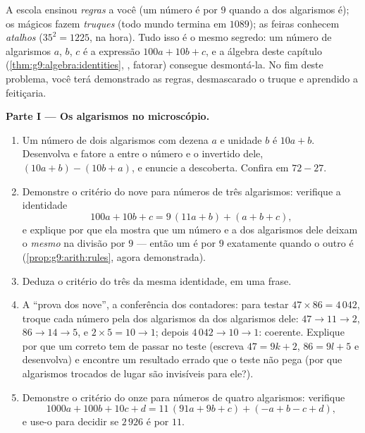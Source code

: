 \begin{problem}
\label{pb:g9:algebra:1}
A escola ensinou \emph{regras} a você (um número é  por $9$
quando a  dos algarismos é); os mágicos fazem \emph{truques} (todo
mundo termina em $1089$); as feiras conhecem \emph{atalhos}
($35^2 = 1225$, na hora). Tudo isso é o mesmo segredo: um número de
algarismos $a$, $b$, $c$ é a expressão $100a + 10b + c$, e a álgebra
deste capítulo (\cref{thm:g9:algebra:identities}, , fatorar)
consegue desmontá-la. No fim deste problema, você terá demonstrado as
regras, desmascarado o truque e aprendido a feitiçaria.

\medskip
\noindent\textbf{Parte I --- Os algarismos no microscópio.}
\begin{enumerate}
  \item Um número de dois algarismos com dezena $a$ e unidade $b$ é
        $10a + b$. Desenvolva e fatore a  entre o número e o
        invertido dele, $(10a + b) - (10b + a)$, e enuncie a
        descoberta. Confira em $72 - 27$.
  \item Demonstre o critério do nove para números de três algarismos:
        verifique a identidade
        \[
        100a + 10b + c = 9\,(11a + b) + (a + b + c),
        \]
        e explique por que ela mostra que um número e a  dos
        algarismos dele deixam o \emph{mesmo } na divisão por $9$
        --- então um é  por $9$ exatamente quando o outro é
        (\cref{prop:g9:arith:rules}, agora demonstrada).
  \item Deduza o critério do três da mesma identidade, em uma frase.
  \item A ``prova dos nove'', a conferência dos contadores: para testar
        $47 \times 86 = 4\,042$, troque cada número pela  dos
        algarismos da  dos algarismos dele: $47 \to 11 \to 2$,
        $86 \to 14 \to 5$, e $2 \times 5 = 10 \to 1$; depois
        $4\,042 \to 10 \to 1$: coerente. Explique por que um 
        correto tem de passar no teste (escreva $47 = 9k + 2$,
        $86 = 9l + 5$ e desenvolva) e encontre um resultado errado que
        o teste não pega (por que algarismos trocados de lugar são
        invisíveis para ele?).
  \item Demonstre o critério do onze para números de quatro
        algarismos: verifique
        \[
        1000a + 100b + 10c + d
        = 11\,(91a + 9b + c) + (- a + b - c + d),
        \]
        e use-o para decidir se $2\,926$ é  por $11$.
\end{enumerate}


\end{problem}
